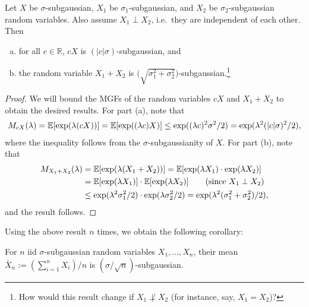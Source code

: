 \documentclass[twoside]{article}
\newcommand{\RR}{\mathbb{R}}
\begin{document}
    \begin{proposition}
      Let $X$ be $\sigma$-subgaussian, $X_1$ be $\sigma_1$-subgaussian, and $X_2$ be $\sigma_2$-subgaussian random variables. Also assume $X_1 \perp X_2$, i.e.\ they are independent of each other. Then
      \begin{enumerate}[(a)]
      \item for all $c \in \RR$, $cX$ is $(|c| \sigma)$-subgaussian, and
      \item the random variable $X_1 + X_2$ is $\big( \sqrt{\sigma_1^2 + \sigma_2^2} \big)$-subgaussian.\footnote{How would this result change if $X_1 \not \perp X_2$ (for instance, say, $X_1 = X_2$)?}
      \end{enumerate}
    \end{proposition}
    \begin{proof}
      We will bound the MGFs of the random variables $cX$ and $X_1 + X_2$ to obtain the desired results. For part (a), note that
      \begin{align*}
        M_{c X}(\lambda) = \mathbb{E}[ \exp(\lambda (cX)) ] = \mathbb{E}[ \exp((\lambda c) X) ] \leq \exp( (\lambda c)^2 \sigma^2 / 2) = \exp( \lambda^2 (|c| \sigma)^2 / 2),
      \end{align*}
      where the inequality follows from the $\sigma$-subgaussianity of $X$. For part (b), note that
      \begin{align*}
        M_{X_1 + X_2}(\lambda) &= \mathbb{E}[ \exp( \lambda (X_1 + X_2)) ] = \mathbb{E}[ \exp(\lambda X_1) \cdot \exp(\lambda X_2) ] \\
        &= \mathbb{E}[ \exp(\lambda X_1) ] \cdot \mathbb{E}[ \exp(\lambda X_2) ] \tag{since $X_1 \perp X_2$} \\
        &\leq \exp( \lambda^2 \sigma_1^2 / 2) \cdot \exp( \lambda \sigma_2^2 / 2) = \exp( \lambda^2 (\sigma_1^2 + \sigma_2^2) / 2),
      \end{align*}
      and the result follows.
    \end{proof}
    Using the above result $n$ times, we obtain the following corollary:
    \begin{corollary}
      For $n$ iid $\sigma$-subgaussian random variables $X_1, \ldots, X_n$, their mean $\bar X_n := (\sum_{i=1}^n X_i) / n$ is $(\sigma / \sqrt n)$-subgaussian.
    \end{corollary}
\end{document}
